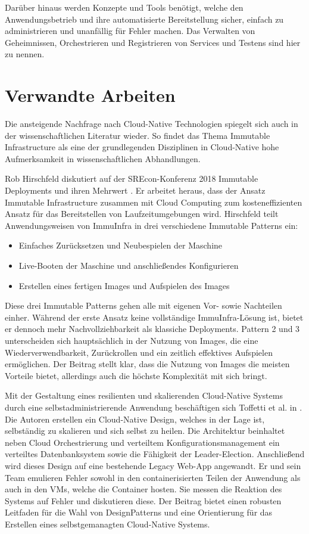 \documentclass[11pt]{scrartcl}
\begin{document}
Darüber hinaus werden Konzepte und Tools benötigt, welche den Anwendungsbetrieb und ihre automatisierte Bereitstellung sicher, einfach zu administrieren und unanfällig für Fehler machen. Das Verwalten von Geheimnissen, Orchestrieren und Registrieren von Services und Testens sind hier zu nennen.

\section{Verwandte Arbeiten}

Die ansteigende Nachfrage nach Cloud-Native Technologien spiegelt sich auch in der wissenschaftlichen Literatur wieder. So findet das Thema Immutable Infrastructure als eine der grundlegenden Disziplinen in Cloud-Native hohe Aufmerksamkeit in wissenschaftlichen Abhandlungen.

Rob Hirschfeld diskutiert auf der SREcon-Konferenz 2018 Immutable Deployments und ihren Mehrwert \cite{Hirschfeld:2018}. Er arbeitet heraus, dass der Ansatz Immutable Infrastructure zusammen mit Cloud Computing zum kosteneffizienten Ansatz für das Bereitstellen von Laufzeitumgebungen wird. Hirschfeld teilt Anwendungsweisen von ImmuInfra in drei verschiedene Immutable Patterns ein:  
\begin{itemize}
\item Einfaches Zurücksetzen und Neubespielen der Maschine
\item Live-Booten der Maschine und anschließendes Konfigurieren
\item Erstellen eines fertigen Images und Aufspielen des Images
\end{itemize}

Diese drei Immutable Patterns gehen alle mit eigenen Vor- sowie Nachteilen einher.
Während der erste Ansatz keine vollständige ImmuInfra-Lösung ist, bietet er dennoch mehr Nachvollziehbarkeit als klassiche Deployments. Pattern 2 und 3 unterscheiden sich hauptsächlich in der Nutzung von Images, die eine Wiederverwendbarkeit, Zurückrollen und ein zeitlich effektives Aufspielen ermöglichen. Der Beitrag stellt klar, dass die Nutzung von Images die meisten Vorteile bietet, allerdings auch die höchste Komplexität mit sich bringt.

Mit der Gestaltung eines resilienten und skalierenden Cloud-Native Systems durch eine selbstadministrierende Anwendung beschäftigen sich Toffetti et al. in \cite{Toffetti:2017}. Die Autoren erstellen ein Cloud-Native Design, welches in der Lage ist, selbständig zu skalieren und sich selbst zu heilen. Die Architektur beinhaltet neben Cloud Orchestrierung und verteiltem Konfigurationsmanagement ein verteiltes Datenbanksystem sowie die Fähigkeit der Leader-Election. Anschließend wird dieses Design auf eine bestehende Legacy Web-App angewandt. 
Er und sein Team emulieren Fehler sowohl in den containerisierten Teilen der Anwendung als auch in den VMs, welche die Container hosten. Sie messen die Reaktion des Systems auf Fehler und diskutieren diese. Der Beitrag bietet einen robusten Leitfaden für die Wahl 
von DesignPatterns und eine Orientierung für das Erstellen eines selbstgemanagten Cloud-Native Systems.
\end{document}
